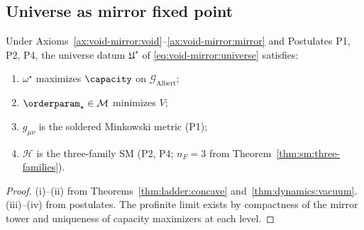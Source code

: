 \subsection{Universe as mirror fixed point}
\label{sec:dynamics:universe}

\begin{theorem}\label{thm:dynamics:universe}
Under Axioms~\ref{ax:void-mirror:void}--\ref{ax:void-mirror:mirror} and
Postulates P1, P2, P4, the universe datum $\mathfrak{U}^\star$ of
\eqref{eq:void-mirror:universe} satisfies:
\begin{enumerate}[label=(\roman*)]
  \item $\omega^\star$ maximizes $\capacity$ on $\mathcal{G}_{\mathrm{Albert}}$;
  \item $\orderparam_\star\in\mathcal{M}$ minimizes $V$;
  \item $g_{\mu\nu}$ is the soldered Minkowski metric (P1);
  \item $\mathcal{H}$ is the three-family SM (P2, P4;
    $n_F=3$ from Theorem~\ref{thm:sm:three-families}).
\end{enumerate}
\end{theorem}

\begin{proof}
(i)--(ii) from Theorems~\ref{thm:ladder:concave} and~\ref{thm:dynamics:vacuum}.
(iii)--(iv) from postulates. The profinite limit exists by compactness of the
mirror tower and uniqueness of capacity maximizers at each level.
\end{proof}